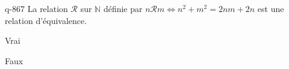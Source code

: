 \begin{truefalse}{q-867}
La relation $\mathcal R$ sur $\mathbb N$ définie par $n\mathcal R m \iff n^2+m^2 = 2nm+2n$ est une relation d'équivalence.
\item Vrai
\item* Faux
\end{truefalse}

